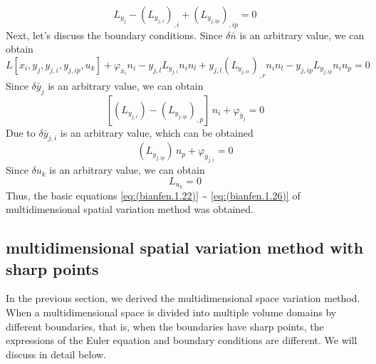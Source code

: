\begin{equation} \label{eq:(bianfen.1.22)}    
L_{y_j} - \left(L_{y_{j,i}}\right)_{,i}+\left(L_{y_{j,ip}}\right)_{,ip} =0
\end{equation}
Next, let's discuss the boundary conditions. Since $ \delta \bar {n}$  is an arbitrary value, we can obtain
\begin{equation} \label{eq:(bianfen.1.23)}    
L[x_i,y_j,y_{j,i},y_{j,ip},u_k]+ \varphi_{\bar {x}_i } n_i 
-y_{j,l} L_{y_{j,i}} n_i n_l   + y_{j,l} \left(L_{y_{j,ir}}\right)_{,r} n_i n_l 
-y_{j,ip} L_{y_{j,ip}} n_i  n_p =0
\end{equation}
Since $ \delta \bar {y} _j $ is an arbitrary value, we can obtain
\begin{equation} \label{eq:(bianfen.1.24)}    
[\left(L_{y_{j,i}}  \right) -\left(L_{y_{j,ip}}\right)_{,p}]\,n_i + \varphi_{\bar {y}_j}=0
\end{equation}
Due to $ \delta \bar {y}_ {j, i}$  is an arbitrary value, which can be obtained
\begin{equation} \label{eq:(bianfen.1.25)}    
\left(L_{y_{j,ip}}  \right)\,n_p +\varphi_{\bar {y}_ {j,i}} =0
\end{equation}
Since $ \delta u_k $ is an arbitrary value, we can obtain
\begin{equation} \label{eq:(bianfen.1.26)}    
L_{u_k} =0
\end{equation}
Thus, the basic equations \ref{eq:(bianfen.1.22)} \~{} \ref{eq:(bianfen.1.26)} of multidimensional spatial variation method was obtained.

\subsection {multidimensional spatial variation method with sharp points}
In the previous section, we derived the multidimensional space variation method. When a multidimensional space is divided into multiple volume domains by different boundaries, that is, when the boundaries have sharp points, the expressions of the Euler equation and boundary conditions are different. We will discuss in detail below.

